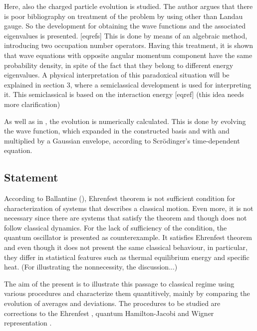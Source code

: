 Here, also the charged particle evolution is studied. The author argues that there is poor bibliography on treatment of the problem by using other than Landau gauge. So the development for obtaining the wave functions and the associated eigenvalues is presented. [eqrefs] This is done by means of an algebraic method, introducing two occupation number operators. Having this treatment, it is shown that wave equations with opposite angular momentum component have the same probability density, in spite of the fact that they belong to different energy eigenvalues. A physical interpretation of this paradoxical situation will be explained in section 3, where a semiclassical development is used for interpreting it. This semiclassical is based on the interaction energy [eqref] (this idea needs more clarification)

As well as in \cite{manfrediQuantumSystemsThat1993}, the evolution is numerically calculated. This is done by evolving the wave function, which expanded in the constructed basis and with and multiplied by a Gaussian envelope, according to Scrödinger’s time-dependent equation.

\subsection*{Statement}

According to Ballantine (\cite{ballentineInadequacyEhrenfestTheorem1994,ballentineQuantumMechanicsModern2010}), Ehrenfest theorem is not sufficient condition for characterization of systems that describes a classical motion. Even more, it is not necessary since there are systems that satisfy the theorem and though does not follow classical dynamics. For the lack of sufficiency of the condition, the quantum oscillator is presented as counterexample. It satisfies Ehrenfest theorem and even though it does not present the same classical behaviour, in particular, they differ in statistical features such as thermal equilibrium energy and specific heat. (For illustrating the nonnecessity, the discussion...)

The aim of the present is to illustrate this passage to classical regime using various procedures and characterize them quantitively, mainly by comparing the evolution of averages and deviations. The procedures to be studied are corrections to the Ehrenfest , quantum Hamilton-Jacobi  and Wigner representation . 
